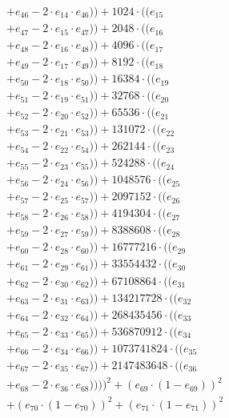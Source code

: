\documentclass[10pt, a4paper]{article}
\begin{document}
\begin{small}
\begin{align*}
& + e_{46} - 2 \cdot e_{14} \cdot e_{46})) + 1024 \cdot ((e_{15} \\
& + e_{47} - 2 \cdot e_{15} \cdot e_{47})) + 2048 \cdot ((e_{16} \\
& + e_{48} - 2 \cdot e_{16} \cdot e_{48})) + 4096 \cdot ((e_{17} \\
& + e_{49} - 2 \cdot e_{17} \cdot e_{49})) + 8192 \cdot ((e_{18} \\
& + e_{50} - 2 \cdot e_{18} \cdot e_{50})) + 16384 \cdot ((e_{19} \\
& + e_{51} - 2 \cdot e_{19} \cdot e_{51})) + 32768 \cdot ((e_{20} \\
& + e_{52} - 2 \cdot e_{20} \cdot e_{52})) + 65536 \cdot ((e_{21} \\
& + e_{53} - 2 \cdot e_{21} \cdot e_{53})) + 131072 \cdot ((e_{22} \\
& + e_{54} - 2 \cdot e_{22} \cdot e_{54})) + 262144 \cdot ((e_{23} \\
& + e_{55} - 2 \cdot e_{23} \cdot e_{55})) + 524288 \cdot ((e_{24} \\
& + e_{56} - 2 \cdot e_{24} \cdot e_{56})) + 1048576 \cdot ((e_{25} \\
& + e_{57} - 2 \cdot e_{25} \cdot e_{57})) + 2097152 \cdot ((e_{26} \\
& + e_{58} - 2 \cdot e_{26} \cdot e_{58})) + 4194304 \cdot ((e_{27} \\
& + e_{59} - 2 \cdot e_{27} \cdot e_{59})) + 8388608 \cdot ((e_{28} \\
& + e_{60} - 2 \cdot e_{28} \cdot e_{60})) + 16777216 \cdot ((e_{29} \\
& + e_{61} - 2 \cdot e_{29} \cdot e_{61})) + 33554432 \cdot ((e_{30} \\
& + e_{62} - 2 \cdot e_{30} \cdot e_{62})) + 67108864 \cdot ((e_{31} \\
& + e_{63} - 2 \cdot e_{31} \cdot e_{63})) + 134217728 \cdot ((e_{32} \\
& + e_{64} - 2 \cdot e_{32} \cdot e_{64})) + 268435456 \cdot ((e_{33} \\
& + e_{65} - 2 \cdot e_{33} \cdot e_{65})) + 536870912 \cdot ((e_{34} \\
& + e_{66} - 2 \cdot e_{34} \cdot e_{66})) + 1073741824 \cdot ((e_{35} \\
& + e_{67} - 2 \cdot e_{35} \cdot e_{67})) + 2147483648 \cdot ((e_{36} \\
& + e_{68} - 2 \cdot e_{36} \cdot e_{68}))))^{2} + (e_{69} \cdot (1 - e_{69}))^{2} \\
& + (e_{70} \cdot (1 - e_{70}))^{2} + (e_{71} \cdot (1 - e_{71}))^{2} \\

\end{align*}
\end{small}
\end{document}
